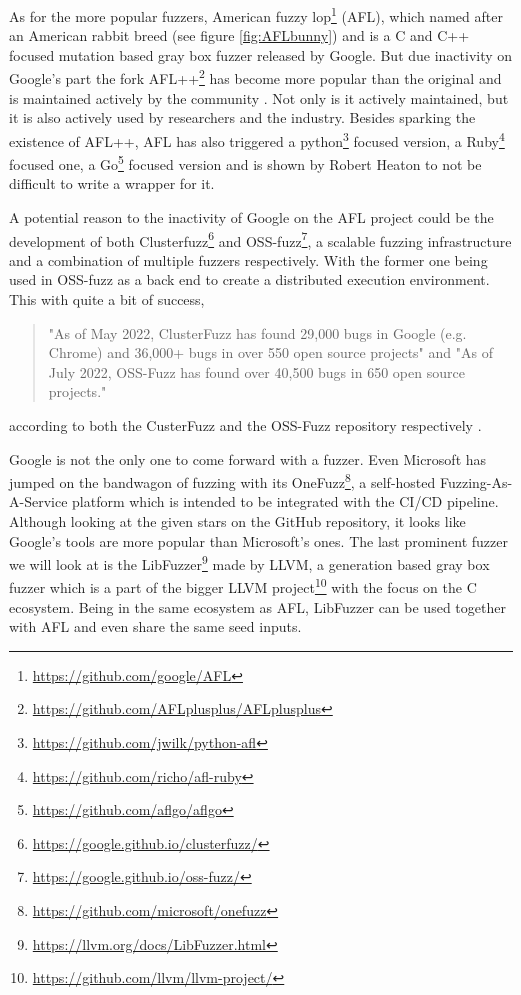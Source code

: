 As for the more popular fuzzers, American fuzzy lop\footnote{\url{https://github.com/google/AFL}} (AFL), which named after an American rabbit breed (see figure \ref{fig:AFLbunny}) and is a C and C++ focused mutation based gray box fuzzer released by Google. But due inactivity on Google's part the fork AFL++\footnote{\url{https://github.com/AFLplusplus/AFLplusplus}} has become more popular than the original and is maintained actively by the community \cite{27AFL++}. Not only is it actively maintained, but it is also actively used by researchers and the industry. Besides sparking the existence of AFL++, AFL has also triggered a python\footnote{\url{https://github.com/jwilk/python-afl}} focused version, a Ruby\footnote{\url{https://github.com/richo/afl-ruby}} focused one, a Go\footnote{\url{https://github.com/aflgo/aflgo}} focused version and is shown by Robert Heaton \cite{AFLWrapper} to not be difficult to write a wrapper for it.

A potential reason to the inactivity of Google on the AFL project could be the development of both Clusterfuzz\footnote{\url{https://google.github.io/clusterfuzz/}} and OSS-fuzz\footnote{\url{https://google.github.io/oss-fuzz/}}, a scalable fuzzing infrastructure and a combination of multiple fuzzers respectively. With the former one being used in OSS-fuzz as a back end to create a distributed execution environment. This with quite a bit of success,
\begin{quote} %
	"As of May 2022, ClusterFuzz has found 29,000 bugs in Google (e.g. Chrome) and 36,000+ bugs in over 550 open source projects" and \newline
	"As of July 2022, OSS-Fuzz has found over 40,500 bugs in 650 open source projects."	
\end{quote} according to both the CusterFuzz and the OSS-Fuzz repository respectively \cite{31OSS-FuzzBugs}. 

Google is not the only one to come forward with a fuzzer. Even Microsoft has jumped on the bandwagon of fuzzing with its OneFuzz\footnote{\url{https://github.com/microsoft/onefuzz}}, a self-hosted Fuzzing-As-A-Service platform which is intended to be integrated with the CI/CD pipeline. Although looking at the given stars on the GitHub repository, it looks like Google's tools are more popular than Microsoft's ones. The last prominent fuzzer we will look at is the LibFuzzer\footnote{\url{https://llvm.org/docs/LibFuzzer.html}} made by LLVM, a generation based gray box fuzzer which is a part of the bigger LLVM project\footnote{\url{https://github.com/llvm/llvm-project/}} with the focus on the C ecosystem. Being in the same ecosystem as AFL, LibFuzzer can be used together with AFL and even share the same seed inputs.


